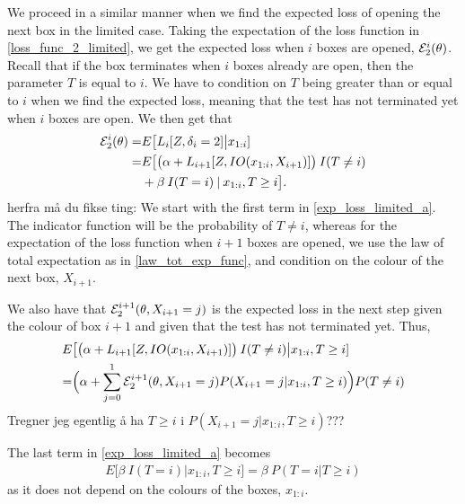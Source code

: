 We proceed in a similar manner when we find the expected loss of opening the next box in the limited case. Taking the expectation of the loss function in \eqref{loss_func_2_limited}, we get the expected loss when $i$ boxes are opened, $\mathcal{E}^i_2(\theta)$. Recall that if the box terminates when $i$ boxes already are open, then the parameter $T$ is equal to $i$. We have to condition on $T$ being greater than or equal to $i$ when we find the expected loss, meaning that the test has not terminated yet when $i$ boxes are open. We then get that
\begin{equation}
\label{exp_loss_limited_a}
    \begin{aligned}
        \mathcal{E}^i_{2}(\theta) 
        = &E\big[L_i[Z,\delta_i=2]\big|x_{1:i}] \\
        =& E\big[\big( \alpha + L_{i+1}[Z,IO(x_{1:i},X_{i+1})] \big) \: I(T\neq i) \\
        &+ \beta \: I(T=i) \: | \: x_{1:i}, T\geq i\big].
    \end{aligned}
\end{equation}
herfra må du fikse ting: 
We start with the first term in \eqref{exp_loss_limited_a}. The indicator function will be the probability of $T\neq i$, whereas for the expectation of the loss function when $i+1$ boxes are opened, we use the law of total expectation as in \eqref{law_tot_exp_func}, and condition on the colour of the next box, $X_{i+1}$. 

We also have that $\mathcal{E}^{i+1}_{2}(\theta,X_{i+1}=j)$ is the expected loss in the next step given the colour of box $i+1$ and given that the test has not terminated yet. Thus,
\begin{equation}
\label{exp_loss_limited_b}
    \begin{aligned}
        E&\big[\big( \alpha + L_{i+1}[Z,IO(x_{1:i},X_{i+1})] \big) \: I(T\neq i)\big | x_{1:i}, T\geq i] \\
        =& \Big( \alpha + \sum_{j=0}^1 \mathcal{E}^{i+1}_{2}(\theta,X_{i+1}=j) P(X_{i+1}=j|x_{1:i},T\geq i) \Big) 
        P(T \neq i)
    \end{aligned}
\end{equation}
Tregner jeg egentlig å ha $T\geq i$ i $P(X_{i+1}=j|x_{1:i},T\geq i)$???

The last term in \eqref{exp_loss_limited_a} becomes
\begin{equation}
\label{exp_loss_limited_c}
    \begin{aligned}
        E\big[ \beta \: I(T=i)|x_{1:i}, T\geq i\big] 
        = \beta \: P(T=i|T\geq i)
    \end{aligned}
\end{equation}
as it does not depend on the colours of the boxes, $x_{1:i}$.

